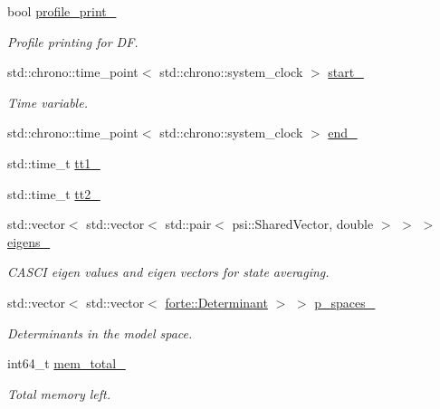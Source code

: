 \begin{DoxyCompactItemize}
\item 
bool \mbox{\hyperlink{classforte_1_1_d_s_r_g___m_r_p_t3_ac7a05164e2aeb450f275ace8b4d68141}{profile\+\_\+print\+\_\+}}
\begin{DoxyCompactList}\small\item\em Profile printing for DF. \end{DoxyCompactList}\item 
std\+::chrono\+::time\+\_\+point$<$ std\+::chrono\+::system\+\_\+clock $>$ \mbox{\hyperlink{classforte_1_1_d_s_r_g___m_r_p_t3_a5cfb4204003849251f3aeb2c6e9eedf6}{start\+\_\+}}
\begin{DoxyCompactList}\small\item\em Time variable. \end{DoxyCompactList}\item 
std\+::chrono\+::time\+\_\+point$<$ std\+::chrono\+::system\+\_\+clock $>$ \mbox{\hyperlink{classforte_1_1_d_s_r_g___m_r_p_t3_a87374317ecaaa1fc3dadee71238a287a}{end\+\_\+}}
\item 
std\+::time\+\_\+t \mbox{\hyperlink{classforte_1_1_d_s_r_g___m_r_p_t3_a1769af0d38cd96df2578205dad1add46}{tt1\+\_\+}}
\item 
std\+::time\+\_\+t \mbox{\hyperlink{classforte_1_1_d_s_r_g___m_r_p_t3_afdea4aab3d4dc3f8e6d451973aaf15ca}{tt2\+\_\+}}
\item 
std\+::vector$<$ std\+::vector$<$ std\+::pair$<$ psi\+::\+Shared\+Vector, double $>$ $>$ $>$ \mbox{\hyperlink{classforte_1_1_d_s_r_g___m_r_p_t3_a22fd832ebfbf1be19fa04fb4a011ace3}{eigens\+\_\+}}
\begin{DoxyCompactList}\small\item\em C\+A\+S\+CI eigen values and eigen vectors for state averaging. \end{DoxyCompactList}\item 
std\+::vector$<$ std\+::vector$<$ \mbox{\hyperlink{namespaceforte_a2076c63fd7b8732004d9e1442ce527c1}{forte\+::\+Determinant}} $>$ $>$ \mbox{\hyperlink{classforte_1_1_d_s_r_g___m_r_p_t3_a30dffa14bad488e78ffe178e3ca962f0}{p\+\_\+spaces\+\_\+}}
\begin{DoxyCompactList}\small\item\em Determinants in the model space. \end{DoxyCompactList}\item 
int64\+\_\+t \mbox{\hyperlink{classforte_1_1_d_s_r_g___m_r_p_t3_a45977e4675ce30ca1750869c7c81fa3f}{mem\+\_\+total\+\_\+}}
\begin{DoxyCompactList}\small\item\em Total memory left. \end{DoxyCompactList}\item 

\end{DoxyCompactItemize}
